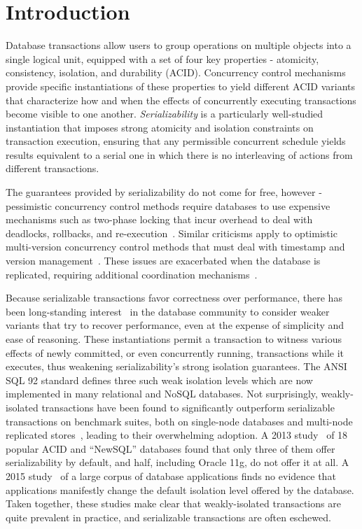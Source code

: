 
\section{Introduction}

Database transactions allow users to group operations on multiple
objects into a single logical unit, equipped with a set of four key
properties - atomicity, consistency, isolation, and durability (ACID).
Concurrency control mechanisms provide specific instantiations of
these properties to yield different ACID variants that characterize
how and when the effects of concurrently executing transactions become
visible to one another.  \emph{Serializability} is a particularly
well-studied instantiation that imposes strong atomicity and isolation
constraints on transaction execution, ensuring that any permissible
concurrent schedule yields results equivalent to a serial one in which
there is no interleaving of actions from different transactions.

The guarantees provided by serializability do not come for free,
however - pessimistic concurrency control methods require databases to
use expensive mechanisms such as two-phase locking that incur overhead
to deal with deadlocks, rollbacks, and
re-execution~\cite{twopl,ullmanbook}.  Similar criticisms apply to
optimistic multi-version concurrency control methods that must deal
with timestamp and version management~\cite{BG81}.  These issues are
exacerbated when the database is replicated, requiring
additional coordination
mechanisms~\cite{cap,sernotavlbl,bailishat,bernsigmod13}.

Because serializable transactions favor correctness over performance,
there has been long-standing interest~\cite{gray1976} in the database
community to consider weaker variants that try to recover performance,
even at the expense of simplicity and ease of reasoning.  These
instantiations permit a transaction to witness various effects of
newly committed, or even concurrently running, transactions while it
executes, thus weakening serializability's strong isolation
guarantees.  The ANSI SQL 92 standard defines three such weak
isolation levels which are now implemented in many relational and
NoSQL databases. Not surprisingly, weakly-isolated transactions have
been found to significantly outperform serializable transactions on
benchmark suites, both on single-node databases and multi-node
replicated stores~\cite{dbtuningbook,bailishat,bailisvldb}, leading to
their overwhelming adoption. A 2013 study~\cite{bailishotos} of 18
popular ACID and ``NewSQL'' databases found that only three of them
offer serializability by default, and half, including Oracle 11g, do
not offer it at all.  A 2015 study~\cite{bailisferal} of a large
corpus of database applications finds no evidence that applications
manifestly change the default isolation level offered by the
database. Taken together, these studies make clear that
weakly-isolated transactions are quite prevalent in practice, and
serializable transactions are often eschewed.

